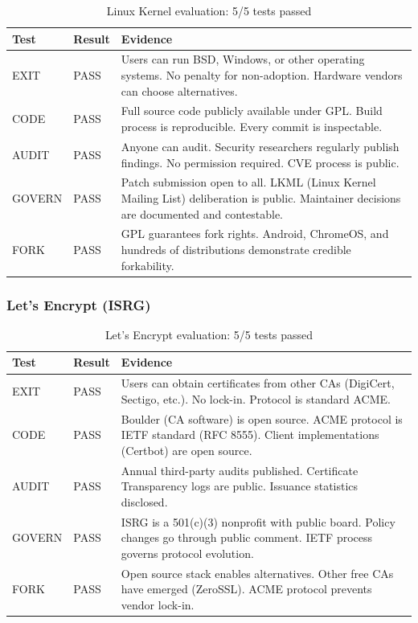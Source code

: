 \documentclass[11pt,a4paper]{article}
\newcommand{\tpass}{\textcolor{passgreen}{PASS}}
\begin{document}
\begin{table}[htbp]
\centering
\begin{tabular}{@{}llp{7cm}@{}}
\toprule
\textbf{Test} & \textbf{Result} & \textbf{Evidence} \\
\midrule
EXIT & \tpass & Users can run BSD, Windows, or other operating systems. No penalty for non-adoption. Hardware vendors can choose alternatives. \\
\addlinespace
CODE & \tpass & Full source code publicly available under GPL. Build process is reproducible. Every commit is inspectable. \\
\addlinespace
AUDIT & \tpass & Anyone can audit. Security researchers regularly publish findings. No permission required. CVE process is public. \\
\addlinespace
GOVERN & \tpass & Patch submission open to all. LKML (Linux Kernel Mailing List) deliberation is public. Maintainer decisions are documented and contestable. \\
\addlinespace
FORK & \tpass & GPL guarantees fork rights. Android, ChromeOS, and hundreds of distributions demonstrate credible forkability. \\
\bottomrule
\end{tabular}
\caption{Linux Kernel evaluation: 5/5 tests passed}
\end{table}

\subsubsection{Let's Encrypt (ISRG)}

\begin{table}[htbp]
\centering
\begin{tabular}{@{}llp{7cm}@{}}
\toprule
\textbf{Test} & \textbf{Result} & \textbf{Evidence} \\
\midrule
EXIT & \tpass & Users can obtain certificates from other CAs (DigiCert, Sectigo, etc.). No lock-in. Protocol is standard ACME. \\
\addlinespace
CODE & \tpass & Boulder (CA software) is open source. ACME protocol is IETF standard (RFC 8555). Client implementations (Certbot) are open source. \\
\addlinespace
AUDIT & \tpass & Annual third-party audits published. Certificate Transparency logs are public. Issuance statistics disclosed. \\
\addlinespace
GOVERN & \tpass & ISRG is a 501(c)(3) nonprofit with public board. Policy changes go through public comment. IETF process governs protocol evolution. \\
\addlinespace
FORK & \tpass & Open source stack enables alternatives. Other free CAs have emerged (ZeroSSL). ACME protocol prevents vendor lock-in. \\
\bottomrule
\end{tabular}
\caption{Let's Encrypt evaluation: 5/5 tests passed}
\end{table}
\end{document}
